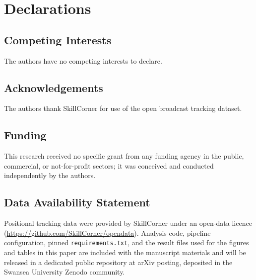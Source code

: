 \section*{Declarations}

\subsection*{Competing Interests}
The authors have no competing interests to declare.

\subsection*{Acknowledgements}
The authors thank SkillCorner for use of the open broadcast tracking
dataset.

\subsection*{Funding}
This research received no specific grant from any funding agency in the
public, commercial, or not-for-profit sectors; it was conceived and
conducted independently by the authors.

\subsection*{Data Availability Statement}
Positional tracking data were provided by SkillCorner under an open-data
licence (\url{https://github.com/SkillCorner/opendata}). Analysis code,
pipeline configuration, pinned \texttt{requirements.txt}, and the result
files used for the figures and tables in this paper are included with
the manuscript materials and will be released in a dedicated public
repository at arXiv posting, deposited in the Swansea University Zenodo community.
